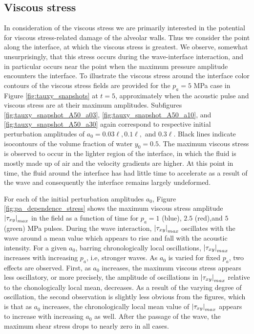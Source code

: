 \subsection{Viscous stress}
In consideration of the viscous stress we are primarily interested in
the potential for viscous stress-related damage of the alveolar
walls. Thus we consider the point along the interface, at which the
viscous stress is greatest. We observe, somewhat unsurprisingly, that
this stress occurs during the wave-interface interaction, and in
particular occurs near the point when the maximum pressure amplitude
encounters the interface. To illustrate the viscous stress around the
interface color contours of the viscous stress fields are provided for
the $p_a = 5$ MPa case in Figure \ref{fig:tauxy_snapshots} at $t=5$,
approximately when the acoustic pulse and viscous stress are at their
maximum amplitudes. Subfigures \ref{fig:tauxy_snapshot_A50_a03},
\ref{fig:tauxy_snapshot_A50_a10}, and \ref{fig:tauxy_snapshot_A50_a30}
again correspond to respective initial perturbation amplitudes of
$a_0 = 0.03\ell, 0.1\ell,$ and $0.3\ell$. Black lines indicate
isocontours of the volume fraction of water $y_0 = 0.5$. The maximum
viscous stress is observed to occur in the lighter region of the
interface, in which the fluid is mostly made up of air and the
velocity gradients are higher. At this point in time, the fluid around
the interface has had little time to accelerate as a result of the
wave and consequently the interface remains largely undeformed.

For each of the initial perturbation amplitudes $a_0$, Figure
\ref{fig:pa_dependence_stress} shows the maximum viscous stress
amplitude $\left|\tau_{xy}\right|_{max}$ in the field as a function of time
for $p_a = 1$ (blue), $2.5$ (red),and $5$ (green) MPa pulses. During
the wave interaction, $\left|\tau_{xy}\right|_{max}$ oscillates with the wave
around a mean value which appears to rise and fall with the acoustic
intensity. For a given $a_0$, barring chronologically local
oscillations, $\left|\tau_{xy}\right|_{max}$ increases with increasing $p_a$,
i.e, stronger waves. As $a_0$ is varied for fixed $p_a$, two effects
are observed. First, as $a_0$ increases, the maximum viscous stress
appears less oscillatory, or more precisely, the amplitude of
oscillations in $\left|\tau_{xy}\right|_{max}$ relative to the chonologically
local mean, decreases. As a result of the varying degree of
oscillation, the second observation is slightly less obvious from the
figures, which is that as $a_0$ increases, the chronologically local
mean value of $\left|\tau_{xy}\right|_{max}$ appears to increase with
increasing $a_0$ as well. After the passage of the wave, the maximum
shear stress drops to nearly zero in all cases.

